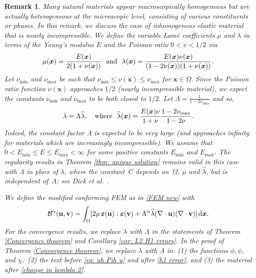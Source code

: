 \documentclass[11pt]{article}
\newcommand{\calB}{\mathcal{B}}
\newcommand{\vu}{{\bf u}}
\newcommand{\vv}{{\bf v}}
\newcommand{\bsx}{{\boldsymbol{x}}}
\numberwithin{equation}{section}
\newcommand{\veps}{{\boldsymbol{\varepsilon}}}
\newcommand{\ud}{\mathrm{d}}
\newtheorem{remark}{Remark}[section]
\begin{document}
\begin{remark} 
{\color{red} Many natural materials appear macroscopically homogeneous but are actually heterogeneous at the microscopic level, consisting of various constituents or phases. 
In this remark, we discuss the case of inhomogenous elastic material that is nearly incompressible. We define the variable Lam\'e coefficients $\mu$  and $\lambda$  in terms of the Young’s modulus $E$ and the Poisson ratio $0<\nu<1/2$ via 
\[\mu(\bsx)=\frac{E(\bsx)}{2(1+\nu(\bsx))}~~{\rm and}~~ \lambda(\bsx)= \frac{E(\bsx)\nu(\bsx)}{(1-2\nu(\bsx))(1+\nu(\bsx))}.
\]
Let $\nu_{\min}$ and $\nu_{\max}$ be such that $\nu_{\min}\le \nu(\bsx)\le \nu_{\max}$ for $\bsx \in \Omega.$ Since the Poisson ratio function  $\nu(\bsx)$ approaches $1/2$ (nearly incompressible material), we expect the constants $\nu_{\min}$ and $\nu_{\max}$ to be both closed to $1/2.$ Let $\Lambda =\frac{1}{1-2\nu_{\max}}$ and so, 
\[\lambda= \Lambda \widehat \lambda,\quad{\rm where}~~ \widehat \lambda (\bsx)=\frac{E(\bsx)\nu}{1+\nu}\frac{1-2\nu_{\max}}{1-2\nu}.\]
Indeed, the constant factor $\Lambda$   is expected to be very large (and approaches  infinity for materials which are increasingly incompressible).
 We assume that $0<E_{\min}\le E\le E_{\max}<\infty$  for some positive constants $E_{\min}$ and $E_{\max}$. The regularity results in Theorem \ref{thm: unique solution} remains valid in this case with $\Lambda$ in place of $\lambda$, where  the constant~$C$ depends on~$\Omega$, $\mu$ and $\widehat \lambda$, but is independent of~$\Lambda$; see Dick et al.~\cite[Theorem 3.2]{Dicketal2024}.   }

We define the modified conforming FEM as in  \eqref{FEM new} with  
\begin{equation*}
\calB^\alpha(\vu,\vv)=\int_\Omega[2\mu\,\veps(\vu):\veps(\vv)+\Lambda^\alpha \widehat \lambda  (\nabla\cdot\vu)(\nabla\cdot\vv)]\,\ud\bsx.
\end{equation*} 
For the convergence results, we replace $\lambda$ with $\Lambda$ in the statements of Theorem \ref {Convergence theorem} and Corollary \ref{cor: L2 H1 errors}. In the proof of Theorem \ref {Convergence theorem}, we replace $\lambda$ with $\Lambda$ in: (1) the functions $\phi,\psi,$ and $\chi,$ (2) the text before \eqref{eq: uh Pih u} and after \eqref{h1 error}, and (3) the material after \eqref{change in lambda 2}.   


\end{remark}
\end{document}
